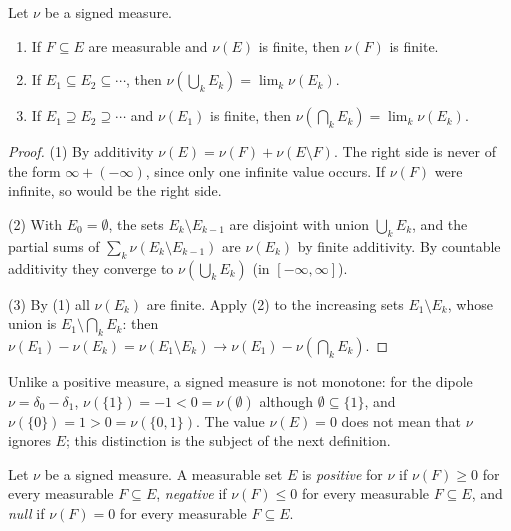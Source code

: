 \begin{proposition}\label{signed-measures:proposition-signed-properties}
Let $\nu$ be a signed measure.
\begin{enumerate}
\item If $F \subseteq E$ are measurable and $\nu(E)$ is finite, then $\nu(F)$ is finite.
\item If $E_1 \subseteq E_2 \subseteq \cdots$, then $\nu(\bigcup_kE_k) = \lim_k\nu(E_k)$.
\item If $E_1 \supseteq E_2 \supseteq \cdots$ and $\nu(E_1)$ is finite, then $\nu(\bigcap_kE_k) = \lim_k\nu(E_k)$.
\end{enumerate}
\end{proposition}

\begin{proof}
(1) By additivity $\nu(E) = \nu(F) + \nu(E \setminus F)$. The right side is never of the form $\infty + (-\infty)$, since only one infinite value occurs. If $\nu(F)$ were infinite, so would be the
right side.

(2) With $E_0 = \emptyset$, the sets $E_k \setminus E_{k-1}$ are disjoint with union $\bigcup_kE_k$, and the partial sums of $\sum_k\nu(E_k \setminus E_{k-1})$ are $\nu(E_k)$ by finite additivity.
By countable additivity they converge to $\nu(\bigcup_kE_k)$ (in $[-\infty, \infty]$).

(3) By (1) all $\nu(E_k)$ are finite. Apply (2) to the increasing sets $E_1 \setminus E_k$, whose union is $E_1 \setminus \bigcap_kE_k$: then
$\nu(E_1) - \nu(E_k) = \nu(E_1 \setminus E_k) \to \nu(E_1) - \nu(\bigcap_kE_k)$.
\end{proof}

Unlike a positive measure, a signed measure is not monotone: for the dipole $\nu = \delta_0 - \delta_1$, $\nu(\{1\}) = -1 < 0 = \nu(\emptyset)$ although $\emptyset \subseteq \{1\}$, and
$\nu(\{0\}) = 1 > 0 = \nu(\{0, 1\})$. The value $\nu(E) = 0$ does not mean that $\nu$ ignores $E$; this distinction is the subject of the next definition.

\begin{definition}\label{signed-measures:definition-positive-set}
Let $\nu$ be a signed measure. A measurable set $E$ is \emph{positive} for $\nu$ if $\nu(F) \geq 0$ for every measurable $F \subseteq E$, \emph{negative} if $\nu(F) \leq 0$ for every measurable
$F \subseteq E$, and \emph{null} if $\nu(F) = 0$ for every measurable $F \subseteq E$.
\end{definition}

